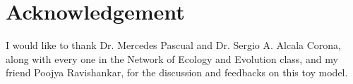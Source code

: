 \section{Acknowledgement}

I would like to thank Dr. Mercedes Pascual and Dr. Sergio A. Alcala Corona, along with every one in the Network of Ecology and Evolution class, and my friend Poojya Ravishankar, for the discussion and feedbacks on this toy model.